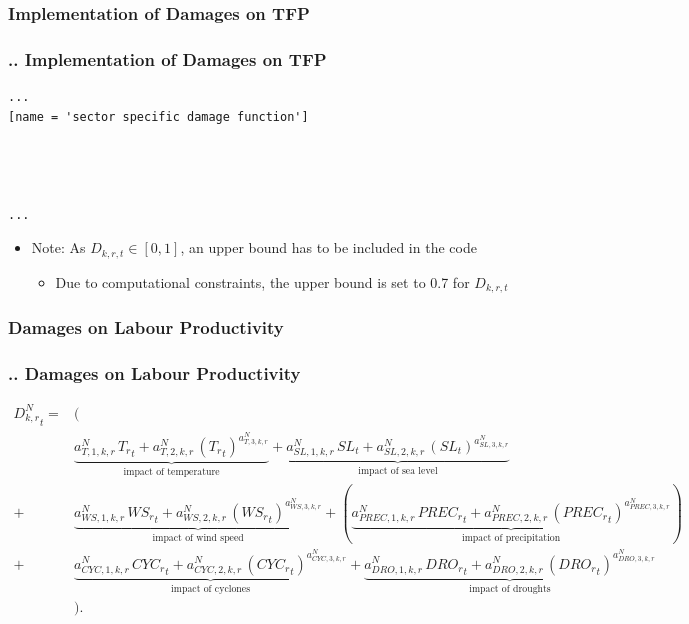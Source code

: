 \documentclass[11pt,aspectratio=169]{beamer}
\begin{document}
\subsubsection{Implementation of Damages on TFP}
\begin{frame}[fragile]
\frametitle{{\thesection.\thesubsection.\thesubsubsection} Implementation of Damages on TFP}
\begin{lstlisting}[frame = single]
...
[name = 'sector specific damage function']




...
\end{lstlisting}
\scriptsize
\begin{itemize}
	\item Note: As $D_{k,r,t} \in [0,1]$, an upper bound has to be included in the code
	\begin{itemize}
		\scriptsize
		\item Due to computational constraints, the upper bound is set to 0.7 for $D_{k,r,t}$
	\end{itemize}
\end{itemize}
\end{frame}

\subsubsection{Damages on Labour Productivity}
\begin{frame}
\frametitle{{\thesection.\thesubsection.\thesubsubsection} Damages on Labour Productivity}
\scriptsize
\begin{align*}
{{D^{N}_{k,r}}_{t}}=& \Big( \nonumber \\
&\underbrace{{{a^{N}_{T,1,k,r}}} \, {{T_{r}}_{t}}+{{a^{N}_{T,2,k,r}}}\, \left({T_{r}}_{t}\right)^{a^{N}_{T,3,k,r}}}_{\mbox{impact of temperature}} + 
\underbrace{{{a^{N}_{SL,1,k,r}}}\, {{SL}_{t}}+{{a^{N}_{SL,2,k,r}}}\, \left({SL}_{t}\right)^{{{a^{N}_{SL,3,k,r}}}}}_{\mbox{impact of sea level}} \nonumber \\
+ & \underbrace{{{a^{N}_{WS,1,k,r}}}\, {{WS_{r}}_{t}}+{{a^{N}_{WS,2,k,r}}}\, \left({WS_{r}}_{t}\right)^{{{a^{N}_{WS,3,k,r}}}}}_{\mbox{impact of wind speed}} 
+ (\underbrace{{{a^{N}_{PREC,1,k,r}}} \, {{PREC_{r}}_{t}}+{{a^{N}_{PREC,2,k,r}}}\, \left({PREC_{r}}_{t}\right)^{{{a^{N}_{PREC,3,k,r}}}}}_{\mbox{impact of precipitation}}) \,  \nonumber \\
+ & \underbrace{{{a^{N}_{CYC,1,k,r}}}\, {{CYC_{r}}_{t}}+{{a^{N}_{CYC,2,k,r}}}\, \left({CYC_{r}}_{t}\right)^{{{a^{N}_{CYC,3,k,r}}}}}_{\mbox{impact of cyclones}}
+ \underbrace{{{a^{N}_{DRO,1,k,r}}} \, {{DRO_{r}}_{t}}+{{a^{N}_{DRO,2,k,r}}}\, \left({DRO_{r}}_{t}\right)^{{{a^{N}_{DRO,3,k,r}}}}}_{\mbox{impact of droughts}} \nonumber \\
&\Big).
\end{align*}
\end{frame}
\end{document}
